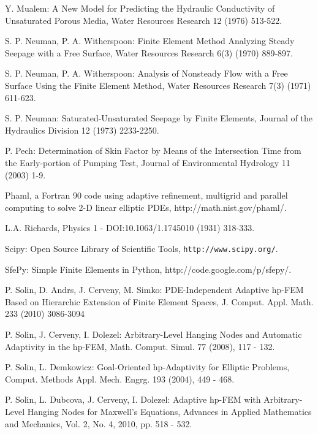 \documentclass[final,3p,times,twocolumn]{elsarticle}
\begin{document}
\begin{thebibliography}{00}
    Y. Mualem: A New Model for Predicting the Hydraulic Conductivity of Unsaturated Porous Media, Water Resources Research 12 (1976) 513-522.

     S. P. Neuman, P. A. Witherspoon: Finite Element Method Analyzing Steady Seepage with a Free Surface, Water Resources Research 6(3) (1970) 889-897.

     S. P. Neuman, P. A. Witherspoon: Analysis of Nonsteady Flow with a Free Surface Using the Finite Element Method, Water Resources Research 7(3) (1971) 611-623.

     S. P. Neuman: Saturated-Unsaturated Seepage by Finite Elements, Journal of the Hydraulics Division 12 (1973) 2233-2250.


     P. Pech: Determination of Skin Factor by Means of the Intersection Time from the Early-portion of Pumping Test, Journal of Environmental Hydrology 11 (2003) 1-9.

Phaml, a Fortran 90 code using adaptive refinement, multigrid and parallel computing to solve 2-D linear elliptic PDEs, http://math.nist.gov/phaml/.


     L.A. Richards, Physics 1 - DOI:10.1063/1.1745010 (1931) 318-333.

     Scipy: Open Source Library of Scientific Tools, {\tt http://www.scipy.org/}.

SfePy: Simple Finite Elements in Python, http://code.google.com/p/sfepy/.

    P. Solin, D. Andrs, J. Cerveny, M. Simko: PDE-Independent Adaptive hp-FEM
    Based on Hierarchic Extension of Finite Element Spaces, J. Comput. Appl.
    Math. 233 (2010) 3086-3094

    P. Solin, J. Cerveny, I. Dolezel: Arbitrary-Level Hanging Nodes and Automatic
    Adaptivity in the hp-FEM, Math. Comput. Simul. 77 (2008), 117 - 132.

     P. Solin, L. Demkowicz: Goal-Oriented hp-Adaptivity for 
    Elliptic Problems, Comput. Methods Appl. Mech. Engrg. 193 (2004), 449 - 468.

    P. Solin, L. Dubcova, J. Cerveny, I. Dolezel: Adaptive hp-FEM with Arbitrary-Level
    Hanging Nodes for Maxwell's Equations, Advances in Applied Mathematics and Mechanics,
    Vol. 2, No. 4, 2010, pp. 518 - 532.



\end{thebibliography}
\end{document}
